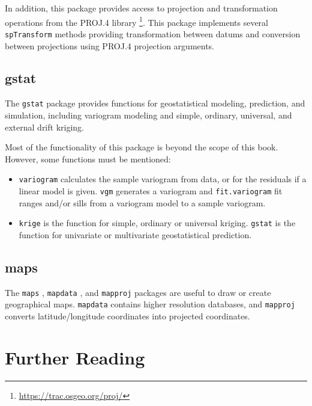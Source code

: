 \documentclass[smallroyalvopaper]{memoir}
\begin{document}
In addition, this package provides access to projection and transformation operations from the PROJ.4 library \footnote{\url{https://trac.osgeo.org/proj/}}. This package implements several \texttt{spTransform} methods providing transformation between datums and conversion between projections using PROJ.4 projection arguments.

\subsection{gstat}
\label{sec:org34536cb}
\label{sec:gstat}

The \texttt{gstat} package \cite{Pebesma2004} provides functions for geostatistical modeling, prediction, and simulation, including variogram modeling and simple, ordinary, universal, and external drift kriging.

Most of the functionality of this package is beyond the scope of this book. However, some functions must be mentioned:

\begin{itemize}
\item \texttt{variogram} calculates the sample variogram from data, or for the residuals if a linear model is given. \texttt{vgm} generates a variogram and \texttt{fit.variogram} fit ranges and/or sills from a variogram model to a sample variogram.

\item \texttt{krige} is the function for simple, ordinary or universal kriging.  \texttt{gstat} is the function for univariate or multivariate geostatistical prediction.
\end{itemize}

\subsection{maps}
\label{sec:org92f9c6a}
\label{sec:maps}

The \texttt{maps} \cite{Becker.Wilks.ea2013}, \texttt{mapdata} \cite{Becker.Wilks.ea2013b}, and \texttt{mapproj} \cite{McIlroy.Brownrigg.ea2013} packages are useful to draw or create geographical maps. \texttt{mapdata} contains higher resolution databases, and \texttt{mapproj} converts latitude/longitude coordinates into projected coordinates.

\section{Further Reading}
\label{sec:orgcdf5d54}
\label{cha:further-reading-spatial}
\end{document}
